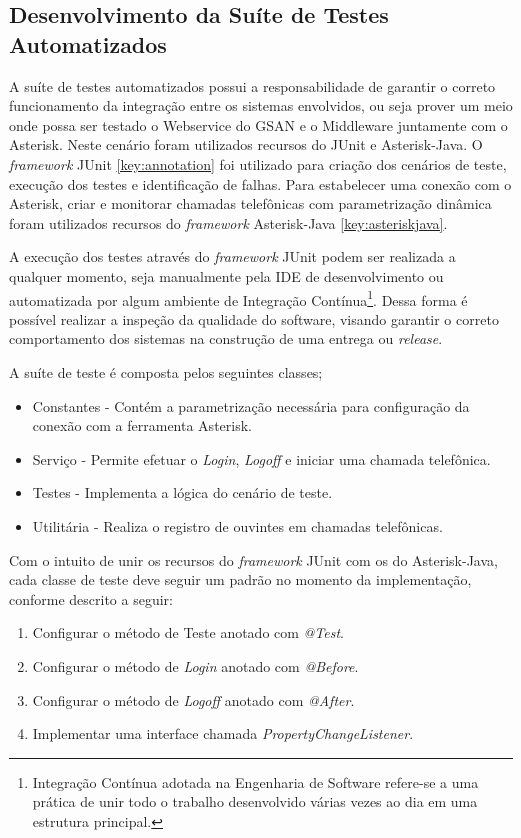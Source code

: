 \subsection{Desenvolvimento da Suíte de Testes Automatizados}

A suíte de testes automatizados possui a responsabilidade de garantir o correto funcionamento da integração entre os sistemas envolvidos, ou seja prover um meio onde possa ser testado o Webservice do GSAN e o Middleware juntamente com o Asterisk. 
Neste cenário foram utilizados recursos do JUnit e Asterisk-Java. O \textit{framework} JUnit \ref{key:annotation} foi utilizado para criação dos cenários de teste, execução dos testes e identificação de falhas. Para estabelecer uma conexão com o Asterisk, criar e monitorar chamadas telefônicas com parametrização dinâmica foram utilizados recursos do \textit{framework} Asterisk-Java \ref{key:asteriskjava}.  

A execução dos testes através do \textit{framework} JUnit podem ser realizada a qualquer momento, seja manualmente pela IDE de desenvolvimento ou automatizada por algum ambiente de Integração Contínua\footnote{Integração Contínua adotada na Engenharia de Software refere-se a uma prática de unir todo o trabalho desenvolvido várias vezes ao dia em uma estrutura principal.}. Dessa forma é possível realizar a inspeção da qualidade do software, visando garantir o correto comportamento dos sistemas na construção de uma entrega ou \textit{release}.

A suíte de teste é composta pelos seguintes classes;
\begin{itemize}
	\item Constantes - Contém a parametrização necessária para configuração da conexão com a ferramenta Asterisk.
	\item Serviço - Permite efetuar o \textit{Login}, \textit{Logoff} e iniciar uma chamada telefônica.
	\item Testes - Implementa a lógica do cenário de teste.
	\item Utilitária - Realiza o registro de ouvintes em chamadas telefônicas.
\end{itemize}


Com o intuito de unir os recursos do \textit{framework} JUnit com os do Asterisk-Java, cada classe de teste deve seguir um padrão no momento da implementação, conforme descrito a seguir:

\begin{enumerate}
	\item Configurar o método de Teste anotado com \textit{@Test}.
	\item Configurar o método de \textit{Login} anotado com \textit{@Before}.
	\item Configurar o método de \textit{Logoff} anotado com \textit{@After}.
	\item Implementar uma interface chamada \textit{PropertyChangeListener}.	
\end{enumerate}

